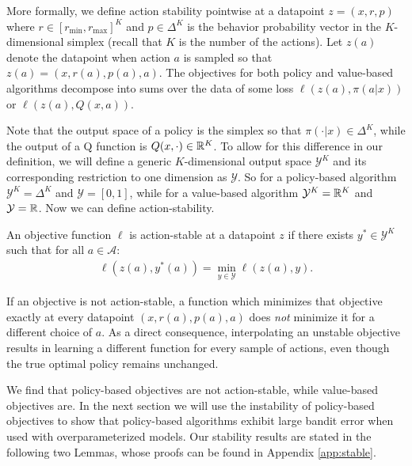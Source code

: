 
More formally, we define action stability pointwise at a datapoint $ z = (x,r,p)$ where $ r\in [r_{\min}, r_{\max}]^K$ and $ p \in \Delta^K$ is the behavior probability vector in the $K$-dimensional simplex (recall that $ K $ is the number of the actions). Let $ z(a)$ denote the datapoint when action $ a $ is sampled so that $ z(a) = (x, r(a), p(a), a)$. The objectives for both policy and value-based algorithms decompose into sums over the data of some loss $ \ell(z(a), \pi(a|x))$ or $ \ell(z(a), Q(x,a))$.

Note that the output space of a policy is the simplex so that $ \pi(\cdot|x) \in \Delta^K$, while the output of a Q function is $ Q(x, \cdot) \in \mathbb{R}^K$.
To allow for this difference in our definition, we will define a generic $ K$-dimensional output space $ \mathcal{Y}^K$ and its corresponding restriction to one dimension as $ \mathcal{Y}$.
So for a policy-based algorithm $ \mathcal{Y}^K = \Delta^K$ and $ \mathcal{Y} = [0,1]$, while for a value-based algorithm $ \mathcal{Y}^K = \mathbb{R}^K$ and $ \mathcal{Y} = \mathbb{R}$. Now we can define action-stability.

\begin{definition}
An objective function $ \ell$ is action-stable at a datapoint $ z$ if there exists $ y^* \in \mathcal{Y}^K$ such that for all $ a \in \mathcal{A}$:
\begin{align*}
    \ell(z(a), y^*(a)) = \min_{y \in \mathcal{Y}} \ell(z(a), y).
\end{align*}
\end{definition}

If an objective is not action-stable, a function which minimizes that objective exactly at every datapoint $(x, r(a), p(a), a)$ does \emph{not} minimize it for a different choice of $a$.
As a direct consequence, interpolating an unstable objective results in learning a different function for every sample of actions, even though the true optimal policy remains unchanged.

We find that policy-based objectives are not action-stable, while value-based objectives are.
In the next section we will use the instability of policy-based objectives to show that policy-based algorithms exhibit large bandit error when used with overparameterized models.
Our stability results are stated in the following two Lemmas, whose proofs can be found in Appendix \ref{app:stable}.

